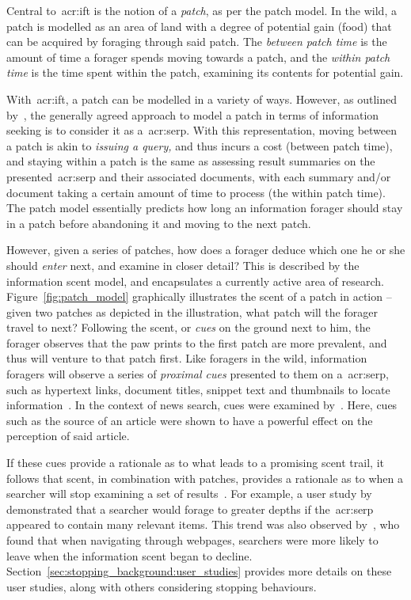 Central to~\gls{acr:ift} is the notion of a \emph{patch}, as per the patch model. In the wild, a patch is modelled as an area of land with a degree of potential gain (food) that can be acquired by foraging through said patch. The \emph{between patch time} is the amount of time a forager spends moving towards a patch, and the \emph{within patch time} is the time spent within the patch, examining its contents for potential gain.

With~\gls{acr:ift}, a patch can be modelled in a variety of ways. However, as outlined by~\cite{azzopardi2015theories}, the generally agreed approach to model a patch in terms of information seeking is to consider it as a~\gls{acr:serp}. With this representation, moving between a patch is akin to \emph{issuing a query,} and thus incurs a cost (between patch time), and staying within a patch is the same as assessing result summaries on the presented~\gls{acr:serp} and their associated documents, with each summary and/or document taking a certain amount of time to process (the within patch time). The patch model essentially predicts how long an information forager should stay in a patch before abandoning it and moving to the next patch.

However, given a series of patches, how does a forager deduce which one he or she should \emph{enter} next, and examine in closer detail? This is described by the information scent model, and encapsulates a currently active area of research. Figure~\ref{fig:patch_model} graphically illustrates the scent of a patch in action -- given two patches as depicted in the illustration, what patch will the forager travel to next? Following the scent, or \emph{cues} on the ground next to him, the forager observes that the paw prints to the first patch are more prevalent, and thus will venture to that patch first. Like foragers in the wild, information foragers will observe a series of \emph{proximal cues} presented to them on a~\gls{acr:serp}, such as hypertext links, document titles, snippet text and thumbnails to locate information~\citep{pirolli1995ift, pirolli1999ift, chi2001information_scent, oltston2003scenttrails, pirolli2007ift}. In the context of news search, cues were examined by~\cite{sundar2007news_scent}. Here, cues such as the source of an article were shown to have a powerful effect on the perception of said article.

If these cues provide a rationale as to what leads to a promising scent trail, it follows that scent, in combination with patches, provides a rationale as to when a searcher will stop examining a set of results~\citep{pirolli1999ift, wu2012dc, wu2014information_scent}. For example, a user study by~\cite{wu2014information_scent} demonstrated that a searcher would forage to greater depths if the~\gls{acr:serp} appeared to contain many relevant items. This trend was also observed by~\cite{card2001scent_graphs}, who found that when navigating through webpages, searchers were more likely to leave when the information scent began to decline. Section~\ref{sec:stopping_background:user_studies} provides more details on these user studies, along with others considering stopping behaviours.

